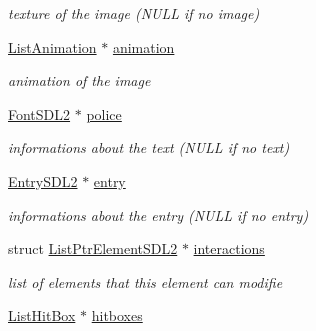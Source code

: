 \begin{DoxyCompactItemize}
\begin{DoxyCompactList}\small\item\em texture of the image (N\+U\+LL if no image) \end{DoxyCompactList}\item 
\hyperlink{structListAnimation}{List\+Animation} $\ast$ \hyperlink{structElementSDL2_a9b7927abbd7b67f843758ff65436fbb5}{animation}\hypertarget{structElementSDL2_a9b7927abbd7b67f843758ff65436fbb5}{}\label{structElementSDL2_a9b7927abbd7b67f843758ff65436fbb5}

\begin{DoxyCompactList}\small\item\em animation of the image \end{DoxyCompactList}\item 
\hyperlink{structFontSDL2}{Font\+S\+D\+L2} $\ast$ \hyperlink{structElementSDL2_a785d4fada0ba0ac6b5ce7a53c379f8cd}{police}\hypertarget{structElementSDL2_a785d4fada0ba0ac6b5ce7a53c379f8cd}{}\label{structElementSDL2_a785d4fada0ba0ac6b5ce7a53c379f8cd}

\begin{DoxyCompactList}\small\item\em informations about the text (N\+U\+LL if no text) \end{DoxyCompactList}\item 
\hyperlink{structEntrySDL2}{Entry\+S\+D\+L2} $\ast$ \hyperlink{structElementSDL2_a9c99c1c34dcf0e52baaca7a64598bd8a}{entry}\hypertarget{structElementSDL2_a9c99c1c34dcf0e52baaca7a64598bd8a}{}\label{structElementSDL2_a9c99c1c34dcf0e52baaca7a64598bd8a}

\begin{DoxyCompactList}\small\item\em informations about the entry (N\+U\+LL if no entry) \end{DoxyCompactList}\item 
struct \hyperlink{structListPtrElementSDL2}{List\+Ptr\+Element\+S\+D\+L2} $\ast$ \hyperlink{structElementSDL2_aca39f22199862196fc52dfcecafeca4a}{interactions}\hypertarget{structElementSDL2_aca39f22199862196fc52dfcecafeca4a}{}\label{structElementSDL2_aca39f22199862196fc52dfcecafeca4a}

\begin{DoxyCompactList}\small\item\em list of elements that this element can modifie \end{DoxyCompactList}\item 
\hyperlink{structListHitBox}{List\+Hit\+Box} $\ast$ \hyperlink{structElementSDL2_aa4af7ab8949d93544da609659a4011c0}{hitboxes}\hypertarget{structElementSDL2_aa4af7ab8949d93544da609659a4011c0}{}\label{structElementSDL2_aa4af7ab8949d93544da609659a4011c0}


\end{DoxyCompactItemize}
